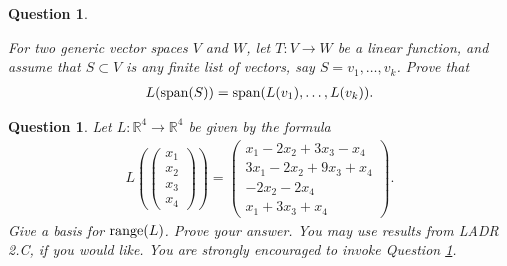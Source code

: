 \documentclass[12pt]{article}
\newtheorem{question}[thm]{Question}
\def\real{{\mathbb R}}
\def\SpanLA{\textnormal{span}}
\def\range{\textnormal{range}}
\newcommand{\ColVecFour}[4]{\begin{pmatrix} #1\\ #2\\#3 \\ #4\end{pmatrix}}
\begin{document}
\begin{question}\label{que:LOfSpan}
	\normalfont
	
	For two generic vector spaces $V$ and $W$, let $T:V\to W$ be a linear function, and assume that $S\subset V$ is any finite list of vectors, say $S=v_1,\dots, v_k$.  Prove that
	\begin{align*}
		L(\SpanLA(S)) = \SpanLA(L(v_1),\dots, L(v_k) ). 
	\end{align*}
	

\end{question}

\vspace{.8cm}


\begin{question}
	\normalfont
	
	Let $L: \real^4\to\real^4$ be given by the formula
	\begin{align*}
		L(\ColVecFour{x_1}{x_2}{x_3}{x_4}) = \ColVecFour{x_1 - 2x_2 + 3x_3 - x_4}{3x_1 -2x_2 + 9x_3 + x_4}{-2x_2 - 2x_4}{x_1 + 3x_3 + x_4}.
	\end{align*}
	  Give a basis for $\range(L)$.  Prove your answer.  You may use results from LADR 2.C, if you would like.  You are strongly encouraged to invoke Question \ref{que:LOfSpan}.
	
\end{question}





\end{document}
